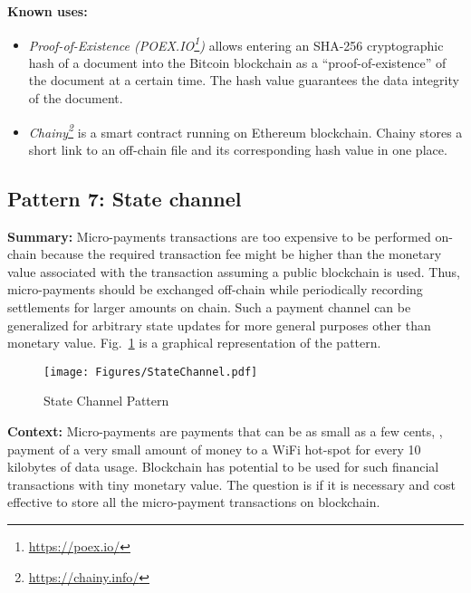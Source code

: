 \vspace{0.5em}\noindent \textbf{Known uses:}
\begin{itemize}
  \item \textit{Proof-of-Existence (POEX.IO\footnote{\url{https://poex.io/}})} allows entering an SHA-256 cryptographic hash of a document into the Bitcoin blockchain as a ``proof-of-existence'' of the document at a certain time. The hash value guarantees the data integrity of the document.
  \item \textit{Chainy\footnote{\url{https://chainy.info/}}} is a smart contract running on Ethereum blockchain. Chainy stores a short link to an off-chain file and its corresponding hash value in one place. 
\end{itemize}

\subsection{ \textbf{Pattern 7: State channel}}
\label{sec:statechannel}


\noindent \textbf{Summary:} Micro-payments transactions are too expensive to be performed on-chain because the required transaction fee might be higher than the monetary value associated with the transaction assuming a public blockchain is used. Thus, micro-payments should be exchanged off-chain while periodically recording settlements for larger amounts on chain. Such a payment channel can be generalized for arbitrary state updates for more general purposes other than monetary value. Fig.~\ref{fig:statechannel} is a graphical representation of the pattern. 

\begin{figure}[t]
\begin{center}
\texttt{[image: Figures/StateChannel.pdf]}
\caption{State Channel Pattern}\label{fig:statechannel}
\end{center}
\end{figure}

\vspace{0.5em}\noindent \textbf{Context:} 
Micro-payments are payments that can be as small as a few cents, \eg, payment of a very small amount of money to a WiFi hot-spot for every 10 kilobytes of data usage. Blockchain has potential to be used for such financial transactions with tiny monetary value. The question is if it is necessary and cost effective to store all the micro-payment transactions on blockchain.



